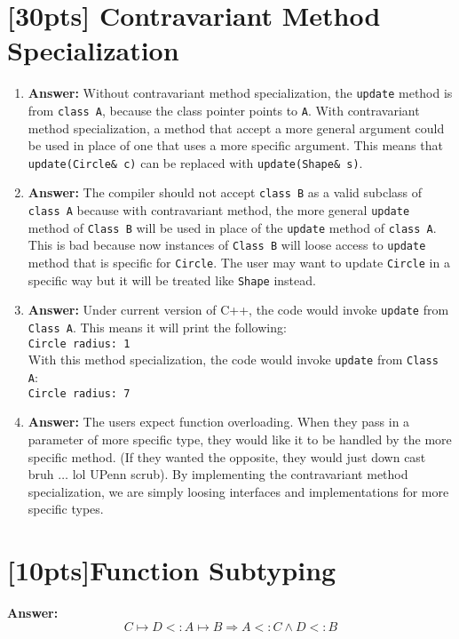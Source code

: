 \documentclass{article}
\begin{document}
\section{[30pts] Contravariant Method Specialization}
\begin{enumerate}
	\item \textbf{Answer: }Without contravariant method specialization, the
		\texttt{update} method is from \texttt{class A}, because the class pointer
		points to \texttt{A}. With contravariant method specialization, a method
		that accept a more general argument could be used in place of one that uses
		a more specific argument. This means that \texttt{update(Circle\& c)} can be
		replaced with \texttt{update(Shape\& s)}. 

	\item \textbf{Answer: }The compiler should not accept \texttt{class B} as a
		valid subclass of \texttt{class A} because with contravariant method, the
		more general \texttt{update} method of \texttt{Class B} will be used in
		place of the \texttt{update} method of \texttt{class A}. This is bad
		because now instances of \texttt{Class B} will loose access to
		\texttt{update} method that is specific for \texttt{Circle}. The user may
		want to update \texttt{Circle} in a specific way but it will be treated like
		\texttt{Shape} instead.

	\item \textbf{Answer: }Under current version of C++, the code would invoke
		\texttt{update} from \texttt{Class A}. This means it will print the
		following:\\
		\texttt{Circle radius: 1}\\
		With this method specialization, the code would invoke \texttt{update} from
		\texttt{Class A}:\\
		\texttt{Circle radius: 7}\\

	\item \textbf{Answer: }The users expect function overloading. When they pass
		in a parameter of more specific type, they would like it to be handled by
		the more specific method. (If they wanted the opposite, they would just down
		cast bruh $\ldots$ lol UPenn scrub). By implementing the contravariant
		method specialization, we are simply loosing interfaces and implementations
		for more specific types.

\end{enumerate}

\section{[10pts]Function Subtyping}
\textbf{Answer: }
$$C \mapsto D <: A \mapsto B \Rightarrow A <: C \wedge D <: B$$
\end{document}
